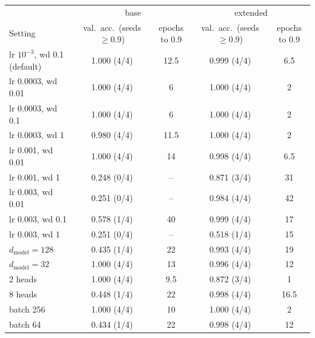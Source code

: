 \begin{tabular}{@{}lcccc@{}}
\toprule
 & \multicolumn{2}{c}{base} & \multicolumn{2}{c}{extended}\\
Setting & val.\ acc.\ (seeds $\geq$0.9) & epochs to 0.9 & val.\ acc.\ (seeds $\geq$0.9) & epochs to 0.9\\
\midrule
lr $10^{-3}$, wd 0.1 (default) & 1.000 (4/4) & 12.5 & 0.999 (4/4) & 6.5 \\
lr 0.0003, wd 0.01 & 1.000 (4/4) & 6 & 1.000 (4/4) & 2 \\
lr 0.0003, wd 0.1 & 1.000 (4/4) & 6 & 1.000 (4/4) & 2 \\
lr 0.0003, wd 1 & 0.980 (4/4) & 11.5 & 1.000 (4/4) & 2 \\
lr 0.001, wd 0.01 & 1.000 (4/4) & 14 & 0.998 (4/4) & 6.5 \\
lr 0.001, wd 1 & 0.248 (0/4) & -- & 0.871 (3/4) & 31 \\
lr 0.003, wd 0.01 & 0.251 (0/4) & -- & 0.984 (4/4) & 42 \\
lr 0.003, wd 0.1 & 0.578 (1/4) & 40 & 0.999 (4/4) & 17 \\
lr 0.003, wd 1 & 0.251 (0/4) & -- & 0.518 (1/4) & 15 \\
$d_\mathrm{model}{=}128$ & 0.435 (1/4) & 22 & 0.993 (4/4) & 19 \\
$d_\mathrm{model}{=}32$ & 1.000 (4/4) & 13 & 0.996 (4/4) & 12 \\
2 heads & 1.000 (4/4) & 9.5 & 0.872 (3/4) & 1 \\
8 heads & 0.448 (1/4) & 22 & 0.998 (4/4) & 16.5 \\
batch 256 & 1.000 (4/4) & 10 & 1.000 (4/4) & 2 \\
batch 64 & 0.434 (1/4) & 22 & 0.998 (4/4) & 12 \\
\bottomrule
\end{tabular}
